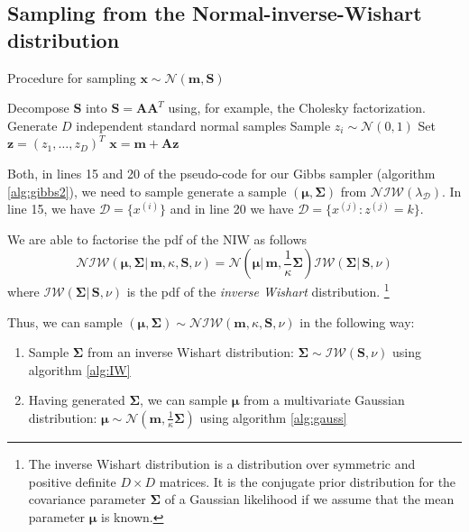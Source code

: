 \documentclass[final,3p,times,twocolumn]{elsarticle}
\let\bs\boldsymbol
\begin{document}
\subsection{Sampling from the Normal-inverse-Wishart distribution}

\begin{algorithm}
\caption{Procedure for sampling $\bs x \sim \mathcal{N}(\bs m,\bs S)$}
\label{alg:gauss}
\begin{algorithmic}[1]
\State Decompose $\bs S$ into $\bs S = \bs A \bs A^T$ using, for example, the Cholesky factorization.
\Statex\State\Comment Generate $D$ independent standard normal samples
\State Sample $z_i \sim \mathcal{N}(0,1)$
\EndFor
\State Set $\bs z = (z_1,\dots,z_D)^T$
\Statex\State\Return $\bs x = \bs m + \bs A \bs z$
\end{algorithmic}
\end{algorithm}

Both, in lines 15 and 20 of the pseudo-code for our Gibbs sampler (algorithm \ref{alg:gibbs2}), we need to sample generate a sample $(\bs\mu,\bs\Sigma)$ from $\mathcal{NIW}(\lambda_\mathcal{D})$.
In line 15, we have $\mathcal{D} = \{x^{(i)}\}$ and in line 20 we have $\mathcal{D} = \{x^{(j)} : z^{(j)} = k\}$.

We are able to factorise the pdf of the NIW as follows 
\begin{equation}
\mathcal{NIW}(\bs\mu,\bs\Sigma|\,\bs m,\kappa,\bs S,\nu) = \mathcal{N}(\bs\mu|\,\bs m,\frac{1}{\kappa}\bs\Sigma)\mathcal{IW}(\bs\Sigma|\,\bs S,\nu)
\end{equation}
where $\mathcal{IW}(\bs\Sigma|\,\bs S,\nu)$ is the pdf of the \emph{inverse Wishart} distribution.
\footnote{The inverse Wishart distribution is a distribution over symmetric and positive definite $D\times D$ matrices. It is the conjugate prior distribution for the covariance parameter $\bs\Sigma$ of a Gaussian likelihood if we assume that the mean parameter $\bs\mu$ is known.}

Thus, we can sample $(\bs\mu,\bs\Sigma)\sim\mathcal{NIW}(\bs m,\kappa,\bs S,\nu)$ in the following way:
\begin{enumerate}
\item Sample $\bs\Sigma$ from an inverse Wishart distribution: $\bs\Sigma \sim \mathcal{IW}(\bs S,\nu)$ using algorithm \ref{alg:IW}
\item Having generated $\bs\Sigma$, we can sample $\bs\mu$ from a multivariate Gaussian distribution: $\bs\mu \sim \mathcal{N}(\bs m,\frac{1}{\kappa}\bs\Sigma)$ using algorithm \ref{alg:gauss}
\end{enumerate}
\end{document}
